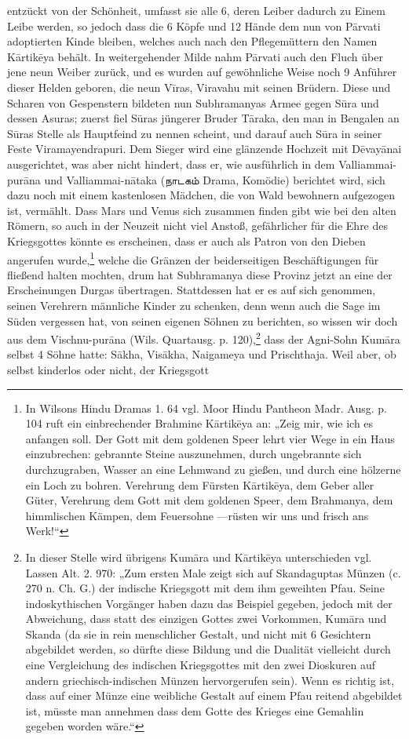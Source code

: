 \documentclass{article}
\newcommand{\TamilText}[1]{\texttamil{#1}}
\newcommand{\tam}[1]{\TamilText{#1}}
\begin{document}
entzückt von der Schönheit, umfasst sie alle 6, deren Leiber dadurch zu Einem Leibe werden, so jedoch dass die 6 Köpfe und 12 Hände dem nun von P\={a}rvati adoptierten Kinde bleiben, welches auch nach den Pflegemüttern den Namen K\={a}rtik\={e}ya behält. In weitergehender Milde nahm P\={a}rvati auch den Fluch über jene neun Weiber zurück, und es wurden auf gewöhnliche Weise noch 9 Anführer dieser Helden geboren, die neun V\={i}ras, Viravahu mit seinen Brüdern. Diese und Scharen von Gespenstern bildeten nun Subhramanyas Armee gegen S\={u}ra und dessen Asuras; zuerst fiel S\={u}ras jüngerer Bruder T\={a}raka, den man in Bengalen an S\={u}ras Stelle als Hauptfeind zu nennen scheint, und darauf auch S\={u}ra in seiner Feste Viramayendrapuri. Dem Sieger wird eine glänzende Hochzeit mit D\={e}vay\={a}nai ausgerichtet, was aber nicht hindert, dass er, wie ausführlich in dem Valliammai-pur\={a}na und Valliammai-n\={a}taka (\tam{நாடகம்} Drama, Komödie) berichtet wird, sich dazu noch mit einem kastenlosen Mädchen, die von Wald bewohnern aufgezogen ist, vermählt. Dass Mars und Venus sich zusammen finden gibt wie bei den alten Römern, so auch in der Neuzeit nicht viel Anstoß, gefährlicher für die Ehre des Kriegsgottes könnte es erscheinen, dass er auch als Patron von den Dieben angerufen wurde,\footnote{In Wilsons Hindu Dramas 1. 64 vgl. Moor Hindu Pantheon Madr. Ausg. p. 104 ruft ein einbrechender Brahmine K\={a}rtik\={e}ya an: „Zeig mir, wie ich es anfangen soll. Der Gott mit dem goldenen Speer lehrt vier Wege in ein Haus einzubrechen: gebrannte Steine auszunehmen, durch ungebrannte sich durchzugraben, Wasser an eine Lehmwand zu gießen, und durch eine hölzerne ein Loch zu bohren. Verehrung dem Fürsten K\={a}rtik\={e}ya, dem Geber aller Güter, Verehrung dem Gott mit dem goldenen Speer, dem Brahmanya, dem himmlischen Kämpen, dem Feuersohne —rüsten wir uns und frisch ans Werk!“} welche die Gränzen der beiderseitigen Beschäftigungen für fließend halten mochten, drum hat Subhramanya diese Provinz jetzt an eine der Erscheinungen Durgas übertragen. Stattdessen hat er es auf sich genommen, seinen Verehrern männliche Kinder zu schenken, denn wenn auch die Sage im Süden vergessen hat, von seinen eigenen Söhnen zu berichten, so wissen wir doch aus dem Vischnu-pur\={a}na (Wils. Quartausg. p. 120),\footnote{In dieser Stelle wird übrigens Kum\={a}ra und K\={a}rtik\={e}ya unterschieden vgl. Lassen Alt. 2. 970: „Zum ersten Male zeigt sich auf Skandaguptas Münzen (c. 270 n. Ch. G.) der indische Kriegsgott mit dem ihm geweihten Pfau. Seine indoskythischen Vorgänger haben dazu das Beispiel gegeben, jedoch mit der Abweichung, dass statt des einzigen Gottes zwei Vorkommen, Kum\={a}ra und Skanda (da sie in rein menschlicher Gestalt, und nicht mit 6 Gesichtern abgebildet werden, so dürfte diese Bildung und die Dualität vielleicht durch eine Vergleichung des indischen Kriegsgottes mit den zwei Dioskuren auf andern griechisch-indischen Münzen hervorgerufen sein). Wenn es richtig ist, dass auf einer Münze eine weibliche Gestalt auf einem Pfau reitend abgebildet ist, müsste man annehmen dass dem Gotte des Krieges eine Gemahlin gegeben worden wäre.“} dass der Agni-Sohn Kum\={a}ra selbst 4 Söhne hatte: S\={a}kha, Vis\={a}kha, Naigameya und Prischthaja. Weil aber, ob selbst kinderlos oder nicht, der Kriegsgott 
\end{document}
